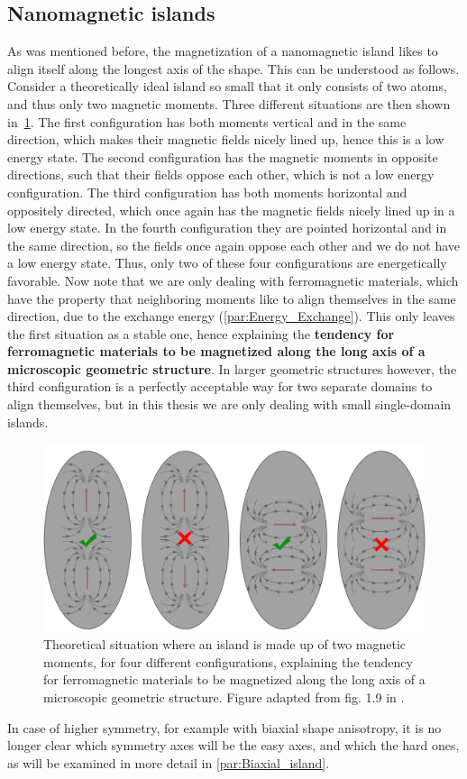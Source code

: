 \documentclass[10pt,a4paper]{article}
\begin{document}
\subsection{Nanomagnetic islands}
As was mentioned before, the magnetization of a nanomagnetic island likes to align itself along the longest axis of the shape. This can be understood as follows. Consider a theoretically ideal island so small that it only consists of two atoms, and thus only two magnetic moments. Three different situations are then shown in~\cref{fig:Intro_IslandEllipticPreferredDirection}.
The first configuration has both moments vertical and in the same direction, which makes their magnetic fields nicely lined up, hence this is a low energy state. The second configuration has the magnetic moments in opposite directions, such that their fields oppose each other, which is not a low energy configuration. The third configuration has both moments horizontal and oppositely directed, which once again has the magnetic fields nicely lined up in a low energy state. In the fourth configuration they are pointed horizontal and in the same direction, so the fields once again oppose each other and we do not have a low energy state. Thus, only two of these four configurations are energetically favorable. Now note that we are only dealing with ferromagnetic materials, which have the property that neighboring moments like to align themselves in the same direction, due to the exchange energy (\cref{par:Energy_Exchange}). This only leaves the first situation as a stable one, hence explaining the \textbf{tendency for ferromagnetic materials to be magnetized along the long axis of a microscopic geometric structure}. In larger geometric structures however, the third configuration is a perfectly acceptable way for two separate domains to align themselves, but in this thesis we are only dealing with small single-domain islands. \par
\begin{figure}[t]
    \centering
    \includegraphics[width=0.9\columnwidth]{Figures/Introduction/NML_Carlton - Figure 1.9 adapted.png}
    \caption{Theoretical situation where an island is made up of two magnetic moments, for four different configurations, explaining the tendency for ferromagnetic materials to be magnetized along the long axis of a microscopic geometric structure. Figure adapted from fig. 1.9 in \cite{NML_Carlton}.}
    \label{fig:Intro_IslandEllipticPreferredDirection}
\end{figure}
In case of higher symmetry, for example with biaxial shape anisotropy, it is no longer clear which symmetry axes will be the easy axes, and which the hard ones, as will be examined in more detail in \cref{par:Biaxial_island}.
\end{document}
